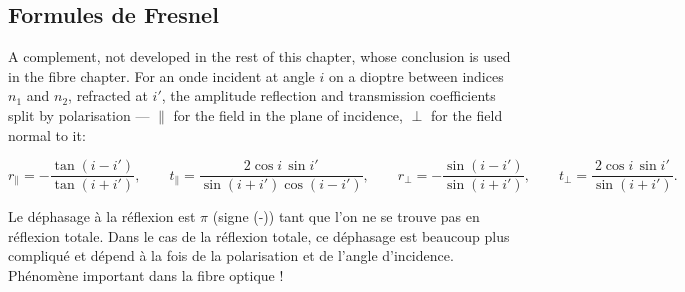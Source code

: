 \subsection{Formules de Fresnel}

A complement, not developed in the rest of this chapter, whose conclusion is
used in the fibre chapter. For an onde incident at angle $i$ on a dioptre
between indices $n_1$ and $n_2$, refracted at $i'$, the amplitude reflection and
transmission coefficients split by polarisation --- $\parallel$ for the field in
the plane of incidence, $\perp$ for the field normal to it:

\[
  r_{\parallel}=-\frac{\tan(i-i')}{\tan(i+i')},\qquad
  t_{\parallel}=\frac{2\cos i\,\sin i'}{\sin(i+i')\cos(i-i')},\qquad
  r_{\perp}=-\frac{\sin(i-i')}{\sin(i+i')},\qquad
  t_{\perp}=\frac{2\cos i\,\sin i'}{\sin(i+i')} .
\]

\begin{conclusion}
  Le déphasage à la réflexion est $\pi$ (signe (-)) tant que l'on ne se trouve
  pas en réflexion totale. Dans le cas de la réflexion totale, ce déphasage est
  beaucoup plus compliqué et dépend à la fois de la polarisation et de l'angle
  d'incidence. Phénomène important dans la fibre optique !
\end{conclusion}
